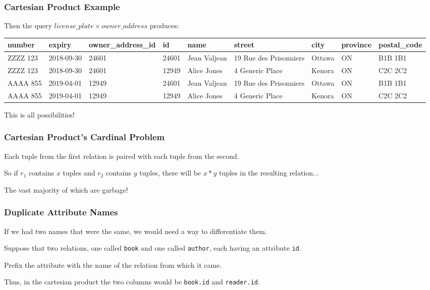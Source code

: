 \begin{frame}
\frametitle{Cartesian Product Example}

Then the query $license\_plate \times owner\_address$ produces:

{\tiny
\begin{center}
	\begin{tabular}{|l|l|l|l|l|l|l|l|l|}\hline
		\textbf{number} & \textbf{expiry} & \textbf{owner\_address\_id} & \textbf{id} & \textbf{name} &\textbf{street} & \textbf{city} & \textbf{province} & \textbf{postal\_code} \\ \hline
		ZZZZ 123 & 2018-09-30 & 24601 & 24601 & Jean Valjean & 19 Rue des Prisonniers & Ottawa & ON & B1B 1B1\\ \hline
ZZZZ 123 & 2018-09-30 & 24601 & 12949 & Alice Jones & 4 Generic Place & Kenora & ON & C2C 2C2\\ \hline
		AAAA 855 & 2019-04-01 & 12949 & 24601 & Jean Valjean & 19 Rue des Prisonniers & Ottawa & ON & B1B 1B1\\ \hline
		AAAA 855 & 2019-04-01 & 12949 & 12949 & Alice Jones & 4 Generic Place & Kenora & ON & C2C 2C2\\ \hline
	\end{tabular}
\end{center}
}

This is all possibilities!

\end{frame}



\begin{frame}
\frametitle{Cartesian Product's Cardinal Problem}

Each tuple from the first relation is paired with each tuple from the second. 

So if $r_{1}$ contains $x$ tuples and $r_{2}$ contains $y$ tuples, there will be $x*y$ tuples in the resulting relation... 

The vast majority of which are garbage! 

\end{frame}



\begin{frame}
\frametitle{Duplicate Attribute Names}

If we had two names that were the same, we would need a way to differentiate them. 

Suppose that two relations, one called \texttt{book} and one called \texttt{author}, each having an attribute \texttt{id}. 

Prefix the attribute with the name of the relation from which it came. 

Thus, in the cartesian product the two columns would be \texttt{book.id} and \texttt{reader.id}.


\end{frame}



